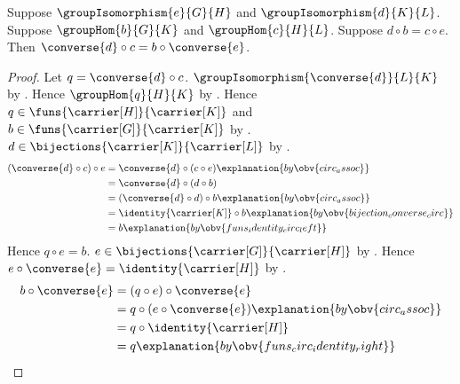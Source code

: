 \begin{theorem}\label{group_isomorphism_square_converse}
    Suppose $\groupIsomorphism{e}{G}{H}$ and
        $\groupIsomorphism{d}{K}{L}$.
    Suppose $\groupHom{b}{G}{K}$ and
        $\groupHom{c}{H}{L}$.
    Suppose $d\circ b=c\circ e$.
    Then $\converse{d}\circ c=b\circ\converse{e}$.
\end{theorem}
\begin{proof}
    Let $q=\converse{d}\circ c$.
    $\groupIsomorphism{\converse{d}}{L}{K}$ by
        .
    Hence $\groupHom{q}{H}{K}$ by
        .
    Hence $q\in\funs{\carrier[H]}{\carrier[K]}$ and
        $b\in\funs{\carrier[G]}{\carrier[K]}$ by
        .
    $d\in\bijections{\carrier[K]}{\carrier[L]}$ by
        .
    \begin{align*}
        (\converse{d}\circ c)\circ e
            &= \converse{d}\circ(c\circ e) \explanation{by \obv{circ_assoc}}
            \\
            &= \converse{d}\circ(d\circ b)
            \\
            &= (\converse{d}\circ d)\circ b \explanation{by \obv{circ_assoc}}
            \\
            &= \identity{\carrier[K]}\circ b \explanation{by \obv{bijection_converse_circ}}
            \\
            &= b \explanation{by \obv{funs_identity_circ_left}}
    \end{align*}
    Hence $q\circ e=b$.
    $e\in\bijections{\carrier[G]}{\carrier[H]}$ by
        .
    Hence $e\circ\converse{e}=\identity{\carrier[H]}$ by
        .
    \begin{align*}
        b\circ\converse{e}
            &= (q\circ e)\circ\converse{e}
            \\
            &= q\circ(e\circ\converse{e})
                \explanation{by \obv{circ_assoc}}
            \\
            &= q\circ\identity{\carrier[H]}
            \\
            &= q
                \explanation{by \obv{funs_circ_identity_right}}
    \end{align*}
\end{proof}

